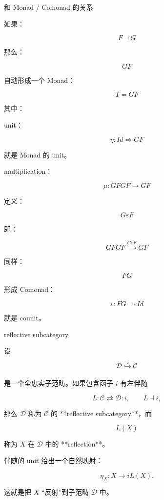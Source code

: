 \documentclass{beamer}
\begin{document}
\begin{frame}{和 Monad / Comonad 的关系}
\begin{markdown}
如果：

$$
F\dashv G
$$

那么：

$$
GF
$$

自动形成一个 Monad：

$$
T=GF
$$

其中：

unit：

$$
\eta:
Id\Rightarrow GF
$$

就是 Monad 的 unit。

multiplication：

$$
\mu:
GFGF
\rightarrow
GF
$$

定义：

$$
G\varepsilon F
$$

即：

$$
GFGF
\xrightarrow{G\varepsilon F}
GF
$$
\end{markdown}
\end{frame}

\begin{frame}[fragile]
同样：

$$
FG
$$

形成 Comonad：

$$
\varepsilon:
FG\Rightarrow Id
$$

就是 counit。
\end{frame}

\begin{frame}[fragile]{reflective subcategory}
\begin{markdown}
设
$$
\mathcal D \xhookrightarrow{i} \mathcal C
$$

是一个全忠实子范畴。如果包含函子 $i$ 有左伴随

$$
L:\mathcal C\rightleftarrows\mathcal D:i,
\qquad L\dashv i,
$$

那么 $\mathcal D$ 称为 $\mathcal C$ 的 **reflective subcategory**，而

$$
L(X)
$$

称为 $X$ 在 $\mathcal D$ 中的 **reflection**。

伴随的 unit 给出一个自然映射：

$$
\eta_X:X\to iL(X).
$$

这就是把 $X$ “反射”到子范畴 $\mathcal D$ 中。
\end{markdown}
\end{frame}
\end{document}
